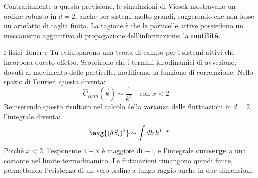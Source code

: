 Contrariamente a questa previsione, le simulazioni di Vicsek mostravano un ordine robusto in $d=2$, anche per sistemi molto grandi, suggerendo che non fosse un artefatto di taglia finita. La ragione è che le particelle attive possiedono un meccanismo aggiuntivo di propagazione dell'informazione: la \textbf{motilità}.

I fisici Toner e Tu svilupparono una teoria di campo per i sistemi attivi che incorpora questo effetto. Scoprirono che i termini idrodinamici di avvezione, dovuti al movimento delle particelle, modificano la funzione di correlazione. Nello spazio di Fourier, questa diventa:
\begin{equation}
    \hat{C}_{conn}(\vec{k}) \sim \frac{1}{k^x} \quad \text{con } x < 2 \quad \text{}
\end{equation}
Reinserendo questo risultato nel calcolo della varianza delle fluttuazioni in $d=2$, l'integrale diventa:
\begin{equation}
    \avg{(\delta\vec{S}_i)^2} \sim \int dk \, k^{1-x}
\end{equation}
Poiché $x<2$, l'esponente $1-x$ è maggiore di $-1$, e l'integrale \textbf{converge} a una costante nel limite termodinamico. Le fluttuazioni rimangono quindi finite, permettendo l'esistenza di un vero ordine a lungo raggio anche in due dimensioni.

